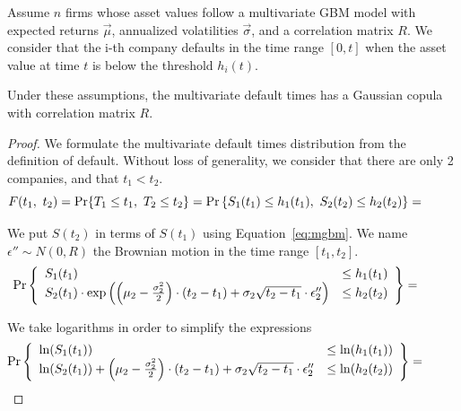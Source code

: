 \documentclass[11pt,fleqn]{book} %
\begin{document}
\begin{proposition}
	\label{prop:mmgc}
	Assume $n$ firms whose asset values follow a multivariate GBM model with 
	expected returns $\vec{\mu}$, annualized volatilities $\vec{\sigma}$, and 
	a correlation matrix $R$. We consider that the i-th company defaults in 
	the time range $[0,t]$ when the asset value at time $t$ is below the 
	threshold $h_i(t)$.
	
	Under these assumptions, the multivariate default times has a Gaussian 
	copula with correlation matrix $R$.
\end{proposition}

\begin{proof}
	We formulate the multivariate default times distribution from the definition 
	of default.	Without loss of generality,  we consider that there are only 2 
	companies, and that $t_1 < t_2$.
	\begin{displaymath}
		\hspace*{-1cm}
		F(t_1,\ t_2) =
		\Pr\{ T_1 \le t_1,\ T_2 \le t_2 \} = 
		\Pr\left\{ S_1(t_1) \le h_1(t_1),\ S_2(t_2) \le h_2(t_2) \right\} = 
	\end{displaymath}
	
	We put $S(t_2)$ in terms of $S(t_1)$ using Equation~\ref{eq:mgbm}. We name 
	$\epsilon'' \sim N(0,R)$ the Brownian motion in the time range $[t_1,t_2]$.
	\begin{displaymath}
		\hspace*{-1cm}
		\Pr\left\{
		\begin{array}{ll}
			S_1(t_1) & \le h_1(t_1)
			\\
			S_2(t_1)\cdot\exp\left(\left(\mu_2 - \frac{\sigma_2^2}{2}\right) \cdot (t_2-t_1) + \sigma_2 \sqrt{t_2-t_1} \cdot \epsilon_2''\right) & \le h_2(t_2)
		\end{array}
		\right\} =
	\end{displaymath}

	We take logarithms in order to simplify the expressions
	\begin{displaymath}
		\hspace*{-1cm}
		\Pr\left\{ 
		\begin{array}{ll}
			\ln(S_1(t_1)) & \le \ln(h_1(t_1))
			\\
			\ln(S_2(t_1)) + \left(\mu_2 - \frac{\sigma_2^2}{2}\right) \cdot (t_2-t_1) + \sigma_2 \sqrt{t_2-t_1} \cdot \epsilon_2'' & \le \ln(h_2(t_2)) 
		\end{array}
		\right\} =
	\end{displaymath}


\end{proof}
\end{document}
